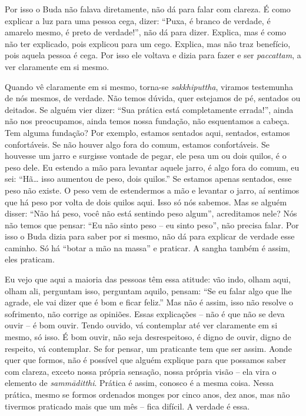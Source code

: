 Por isso o Buda não falava diretamente, não dá para falar com
clareza. É como explicar a luz para uma pessoa cega, dizer: “Puxa, é
branco de verdade, é amarelo mesmo, é preto de verdade!”, não dá para
dizer. Explica, mas é como não ter explicado, pois explicou para um
cego. Explica, mas não traz benefício, pois aquela pessoa é cega. Por
isso ele voltava e dizia para fazer e ser \textit{paccattam}, a ver
claramente em si mesmo. 

Quando vê claramente em si mesmo, torna-se \textit{sakkhiputtha},
viramos testemunha de nós mesmos, de verdade. Não temos dúvida, quer
estejamos de pé, sentados ou deitados. Se alguém vier dizer: “Sua
prática está completamente errada!”, ainda não nos preocupamos, ainda
temos nossa fundação, não esquentamos a cabeça. Tem alguma fundação?
Por exemplo, estamos sentados aqui, sentados, estamos confortáveis. Se
não houver algo fora do comum, estamos confortáveis. Se houvesse um
jarro e surgisse vontade de pegar, ele pesa um ou dois quilos, é o peso
dele. Eu estendo a mão para levantar aquele jarro, é algo fora do
comum, eu sei: “Hã… isso aumentou de peso, dois quilos.” Se estamos
apenas sentados, esse peso não existe. O peso vem de estendermos a mão
e levantar o jarro, aí sentimos que há peso por volta de dois quilos
aqui. Isso só nós sabemos. Mas se alguém disser: “Não há peso, você não
está sentindo peso algum”, acreditamos nele? Nós não temos que pensar:
“Eu não sinto peso – eu sinto peso”, não precisa falar. Por isso o Buda
dizia para saber por si mesmo, não dá para explicar de verdade esse
caminho. Só há “botar a mão na massa” e praticar. A sangha também é
assim, eles praticam.

Eu vejo que aqui a maioria das pessoas têm essa atitude: vão indo,
olham aqui, olham ali, perguntam isso, perguntam aquilo, pensam: “Se eu
falar algo que lhe agrade, ele vai dizer que é bom e ficar feliz.” Mas
não é assim, isso não resolve o sofrimento, não corrige as opiniões.
Essas explicações – não é que não se deva ouvir – é bom ouvir. Tendo
ouvido, vá contemplar até ver claramente em si mesmo, só isso. É bom
ouvir, não seja desrespeitoso, é digno de ouvir, digno de respeito, vá
contemplar. Se for pensar, um praticante tem que ser assim. Aonde quer
que formos, não é possível que alguém explique para que possamos saber
com clareza, exceto nossa própria sensação, nossa própria visão – ela
vira o elemento de \textit{sammāditthi}. Prática é assim, conosco é a
mesma coisa. Nessa prática, mesmo se formos ordenados monges por cinco
anos, dez anos, mas não tivermos praticado mais que um mês – fica
difícil. A verdade é essa. 

